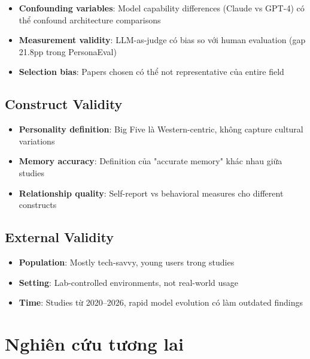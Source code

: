 \documentclass[10pt,leqno]{amsart}
\begin{document}
\begin{itemize}
    \item \textbf{Confounding variables}: Model capability differences (Claude vs GPT-4) có thể confound architecture comparisons
    \item \textbf{Measurement validity}: LLM-as-judge có bias so với human evaluation (gap 21.8pp trong PersonaEval)
    \item \textbf{Selection bias}: Papers chosen có thể not representative của entire field
\end{itemize}

\subsection{Construct Validity}

\begin{itemize}
    \item \textbf{Personality definition}: Big Five là Western-centric, không capture cultural variations
    \item \textbf{Memory accuracy}: Definition của "accurate memory" khác nhau giữa studies
    \item \textbf{Relationship quality}: Self-report vs behavioral measures cho different constructs
\end{itemize}

\subsection{External Validity}

\begin{itemize}
    \item \textbf{Population}: Mostly tech-savvy, young users trong studies
    \item \textbf{Setting}: Lab-controlled environments, not real-world usage
    \item \textbf{Time}: Studies từ 2020--2026, rapid model evolution có làm outdated findings
\end{itemize}


\section{Nghiên cứu tương lai}
\end{document}
